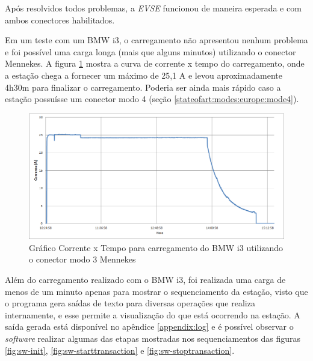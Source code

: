     Após resolvidos todos problemas, a \textit{\ac{EVSE}} funcionou de maneira esperada e com ambos conectores habilitados.

    Em um teste com um BMW i3, o carregamento não apresentou nenhum problema e foi possível uma carga longa (mais que alguns minutos) utilizando o conector Mennekes. A figura \ref{fig:evse-charge} mostra a curva de corrente x tempo do carregamento, onde a estação chega a fornecer um máximo de 25,1 A e levou aproximadamente 4h30m para finalizar o carregamento. Poderia ser ainda mais rápido caso a estação possuísse um conector modo 4 (seção \ref{stateofart:modes:europe:mode4}).

    \begin{figure}[H]
      \begin{center}
        \includegraphics[width=\textwidth,natwidth=1420,natheight=2130]{assets/images/evse-charge.png}
        \caption{Gráfico Corrente x Tempo para carregamento do BMW i3 utilizando o conector modo 3 Mennekes}
        \label{fig:evse-charge}
      \end{center}
    \end{figure}

    Além do carregamento realizado com o BMW i3, foi realizada uma carga de menos de um minuto apenas para mostrar o sequenciamento da estação, visto que o programa gera saídas de texto para diversas operações que realiza internamente, e esse permite a visualização do que está ocorrendo na estação. A saída gerada está disponível no apêndice \ref{appendix:log} e é possível observar o \textit{software} realizar algumas das etapas mostradas nos sequenciamentos das figuras \ref{fig:sw-init}, \ref{fig:sw-starttransaction} e \ref{fig:sw-stoptransaction}.

